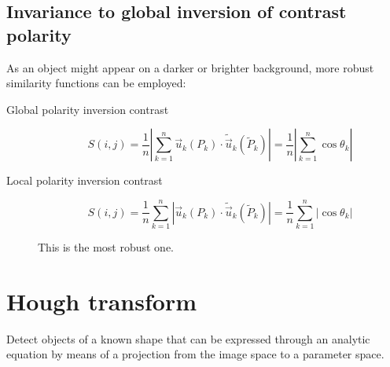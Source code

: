 \subsection{Invariance to global inversion of contrast polarity}

As an object might appear on a darker or brighter background, more robust similarity functions can be employed:
\begin{description}
    \item[Global polarity inversion contrast] 
        \[ S(i, j) = \frac{1}{n} \left\vert \sum_{k=1}^{n} \vec{u}_k(P_k) \cdot \tilde{\vec{u}}_k(\tilde{P}_k) \right\vert = 
            \frac{1}{n} \left\vert \sum_{k=1}^{n} \cos \theta_k \right\vert \]

    \item[Local polarity inversion contrast] 
        \[ S(i, j) = \frac{1}{n} \sum_{k=1}^{n} \left\vert  \vec{u}_k(P_k) \cdot \tilde{\vec{u}}_k(\tilde{P}_k) \right\vert = 
        \frac{1}{n} \sum_{k=1}^{n} \left\vert \cos \theta_k \right\vert \]

        \begin{remark}
            This is the most robust one.
        \end{remark}
\end{description}



\section{Hough transform}

Detect objects of a known shape that can be expressed through an analytic equation 
by means of a projection from the image space to a parameter space.

